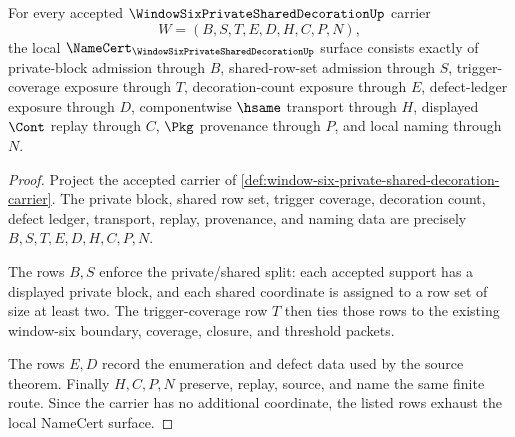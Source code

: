 \begin{theorem}\label{thm:window-six-private-shared-decoration-obligations}
For every accepted $\WindowSixPrivateSharedDecorationUp$ carrier
$$
W=(B,S,T,E,D,H,C,P,N),
$$
the local $\NameCert_{\WindowSixPrivateSharedDecorationUp}$ surface consists exactly of private-block admission through $B$, shared-row-set admission through $S$, trigger-coverage exposure through $T$, decoration-count exposure through $E$, defect-ledger exposure through $D$, componentwise $\hsame$ transport through $H$, displayed $\Cont$ replay through $C$, $\Pkg$ provenance through $P$, and local naming through $N$.
\end{theorem}
\begin{proof}
Project the accepted carrier of \autoref{def:window-six-private-shared-decoration-carrier}. The private block, shared row set, trigger coverage, decoration count, defect ledger, transport, replay, provenance, and naming data are precisely $B,S,T,E,D,H,C,P,N$.

The rows $B,S$ enforce the private/shared split: each accepted support has a displayed private block, and each shared coordinate is assigned to a row set of size at least two. The trigger-coverage row $T$ then ties those rows to the existing window-six boundary, coverage, closure, and threshold packets.

The rows $E,D$ record the enumeration and defect data used by the source theorem. Finally $H,C,P,N$ preserve, replay, source, and name the same finite route. Since the carrier has no additional coordinate, the listed rows exhaust the local NameCert surface.
\end{proof}

